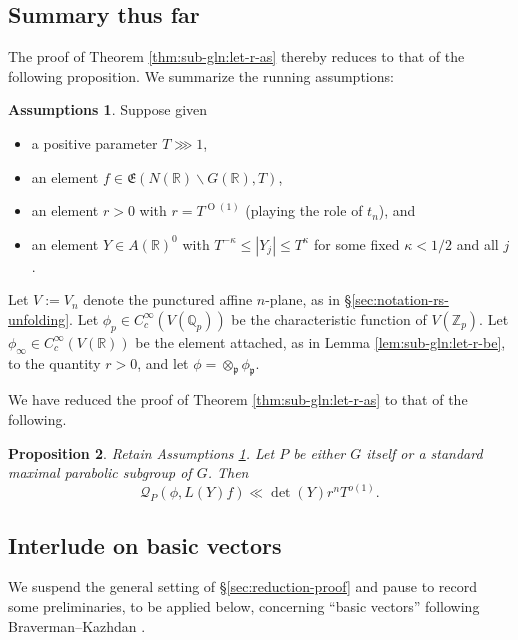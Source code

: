 \documentclass[reqno]{amsart}
\def\O{\operatorname{O}}
\theoremstyle{plain} \newtheorem{theorem} {Theorem}
\newtheorem{proposition} [theorem] {Proposition}
\theoremstyle{definition} \newtheorem{definition} [theorem] {Definition}
\newtheorem{assumptions} [theorem] {Assumptions}
\theoremstyle{itplain} %
\numberwithin{equation}{section}
\numberwithin{theorem}{section}
\renewcommand{\leq}{\leqslant}
\begin{document}
\subsection{Summary thus far}\label{sec:summary-thus-far}
The proof of Theorem \ref{thm:sub-gln:let-r-as} thereby reduces to that of the following proposition.  We summarize the running assumptions:
\begin{assumptions}\label{assumptions:furth-reduct-proof}
Suppose given
  \begin{itemize}
  \item a positive parameter $T \ggg 1$,
  \item an element $f \in \mathfrak{E}(N(\mathbb{R}) \backslash G(\mathbb{R}), T)$, 
  \item an element $r > 0$ with $r =T^{\O(1)}$ (playing the role of $t_n$), and
  \item an element $Y \in A(\mathbb{R})^0$ with $T^{-\kappa} \leq |Y_j| \leq T^{\kappa}$ for some fixed $\kappa < 1/2$ and all $j$.
  \end{itemize}
  Let $V := V_n$ denote the punctured affine $n$-plane, as in \S\ref{sec:notation-rs-unfolding}.  Let $\phi_p \in C_c^\infty(V(\mathbb{Q}_p))$ be the characteristic function of $V(\mathbb{Z}_p)$.  Let $\phi_\infty \in C_c^\infty(V(\mathbb{R}))$ be the element attached, as in Lemma \ref{lem:sub-gln:let-r-be}, to the quantity $r > 0$, and let $\phi = \otimes_{\mathfrak{p}} \phi_\mathfrak{p}$.
\end{assumptions}


We have reduced the proof of Theorem \ref{thm:sub-gln:let-r-as} to that of the following.
\begin{proposition}\label{prop:bound-after-theta-degenerate-case-2}
  Retain Assumptions \ref{assumptions:furth-reduct-proof}.  Let $P$ be either $G$ itself or a standard maximal parabolic subgroup of $G$.  Then
  \begin{equation*}
    \mathcal{Q}_P(\phi,L(Y) f)
    \ll
    \det(Y) r^{n} T^{o(1)}.
  \end{equation*}
\end{proposition}


\subsection{Interlude on basic vectors}\label{sec:interl-basic-vect}
We suspend the general setting of \S\ref{sec:reduction-proof} and pause to record some preliminaries, to be applied below, concerning ``basic vectors'' following Braverman--Kazhdan \cite[\S3.12]{MR1694894}.
\end{document}
